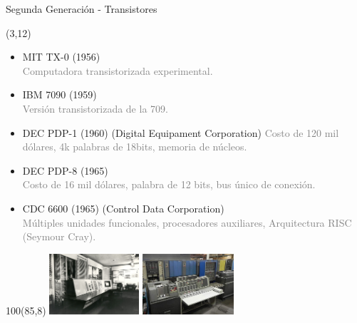\documentclass[aspectratio=169]{beamer}
\begin{document}
\begin{frame}[fragile,t]{Segunda Generación - Transistores}
    \begin{textblock}{80}(3,12)
    \begin{itemize}
    \setlength\itemsep{0.2cm}
    \item<1-> MIT TX-0 (1956)\\
    \textcolor{gray}{Computadora transistorizada experimental.}
    \item<1-> IBM 7090 (1959)\\ 
    \textcolor{gray}{Versión transistorizada de la 709.}
    \item<2-> DEC PDP-1 (1960) {\small (Digital Equipament Corporation)}
    \textcolor{gray}{Costo de 120 mil dólares, 4k palabras de 18bits, memoria de núcleos.}
    \item<2-> DEC PDP-8 (1965)\\
    \textcolor{gray}{Costo de 16 mil dólares, palabra de 12 bits, bus único de conexión.}
    \item<2-> CDC 6600 (1965) {\small (Control Data Corporation)}\\
    \textcolor{gray}{Múltiples unidades funcionales, procesadores auxiliares, Arquitectura RISC (Seymour Cray).}
    \end{itemize}
    \end{textblock}
    \begin{textblock}{100}(85,8)
    \includegraphics[height=2.26cm]{img/MIT-TX-0.jpg} \hspace{0.1cm} \includegraphics[height=2.26cm]{img/IBM7094.jpg}\\
    \vspace{0.1cm}

\end{textblock}
\end{frame}
\end{document}
